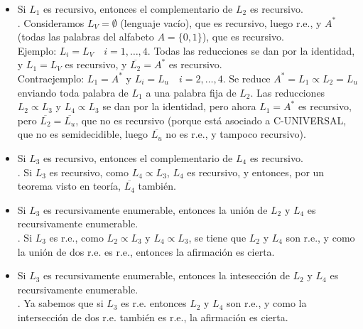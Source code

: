 \begin{ejercicio}
\begin{itemize}
        . Igual que en el apartado anterior, $L_2 \propto L_3 \iff \overline{L_2} \propto \overline{L_3}$. 
        Entonces, si $\overline{L_3}$ fuera recursivo, también lo sería $\overline{L_2}$. Contradicción. 

        \item[e)] Si $L_1$ es recursivo, entonces el complementario de $L_2$ es recursivo. \\
        
        . Consideramos $L_{V} = \emptyset$ (lenguaje vacío), que es recursivo, luego r.e., 
        y $A^*$ (todas las palabras del alfabeto $A = \{0,1\}$), que es recursivo. \\

        Ejemplo: $L_i = L_V \quad i = 1, \ldots, 4$. Todas las reducciones se dan por la identidad, y 
        $L_1 = L_V$ es recursivo, y $\overline{L_2} = A^{*}$ es recursivo. \\

        Contraejemplo: $L_1 = A^{*}$ y $L_i = L_u \quad i = 2, \ldots, 4$. Se reduce $A^{*} = L_1 \propto L_2 = L_u$ 
        enviando toda palabra de $L_1$ a una palabra fija de $L_2$. Las reducciones $L_2 \propto L_3$ y $L_4 \propto L_3$
        se dan por la identidad, pero ahora $L_1 = A^{*}$ es recursivo, pero $\overline{L_2} = \overline{L_u}$, que 
        no es recursivo (porque está asociado a C-UNIVERSAL, que no es semidecidible, luego $\overline{L_u}$ no es r.e., y tampoco
        recursivo). 

        \item[f)] Si $L_3$ es recursivo, entonces el complementario de $L_4$ es recursivo. \\
        
        . Si $L_3$ es recursivo, como $L_4 \propto L_3$, $L_4$ es recursivo, y entonces, por
        un teorema visto en teoría, $\overline{L_4}$ también.

        \item[g)] Si $L_3$ es recursivamente enumerable, entonces la unión de $L_2$ y $L_4$ es recursivamente enumerable. \\
        
        . Si $L_3$ es r.e., como $L_2 \propto L_3$ y $L_4 \propto L_3$, se tiene que 
        $L_2$ y $L_4$ son r.e., y como la unión de dos r.e. es r.e., entonces la afirmación es cierta.

        \item[h)] Si $L_3$ es recursivamente enumerable, entonces la intesección de $L_2$ y $L_4$ es recursivamente enumerable. \\
        
        . Ya sabemos que si $L_3$ es r.e. entonces $L_2$ y $L_4$ son r.e., y como la 
        intersección de dos r.e. también es r.e., la afirmación es cierta.
    \end{itemize}
\end{ejercicio}




